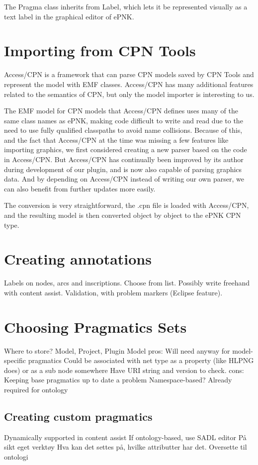 
The Pragma class inherits from Label, which lets it be represented visually as a
text label in the graphical editor of ePNK.

\section{Importing from CPN Tools}
Access/CPN is a framework that can parse CPN models saved by CPN Tools and
represent the model with EMF classes. Access/CPN has many additional features
related to the semantics of CPN, but only the model importer is interesting to
us.

The EMF model for CPN models that Access/CPN defines uses many of the same class
names as ePNK, making code difficult to write and read due to the need to use
fully qualified classpaths to avoid name collisions. Because of this, and the
fact that Access/CPN at the time was missing a few features like importing
graphics, we first considered creating a new parser based on the code in
Access/CPN. But Access/CPN has continually been improved by its author during
development of our plugin, and is now also capable of parsing graphics data. And
by depending on Access/CPN instead of writing our own parser, we can also
benefit from further updates more easily.

The conversion is very straightforward, the .cpn file is loaded with Access/CPN,
and the resulting model is then converted object by object to the ePNK CPN type.

\section{Creating annotations}
Labels on nodes, arcs and inscriptions. 
Choose from list. Possibly write freehand with content assist. Validation, with
problem markers (Eclipse feature).

\section{Choosing Pragmatics Sets}
Where to store? Model, Project, Plugin
Model pros:
	Will need anyway for model-specific pragmatics
	Could be associated with net type as a property (like HLPNG does) or as a sub
	node somewhere
	Have URI string and version to check.
cons:
	Keeping base pragmatics up to date a problem
Namespace-based? Already required for ontology


	\subsection{Creating custom pragmatics}
	Dynamically supported in content assist 
	If ontology-based, use SADL editor
	På sikt eget verktøy
		Hva kan det settes på, hvilke attributter har det.
		Oversette til ontologi

